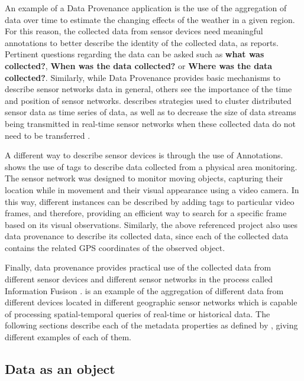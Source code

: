 An example of a Data Provenance application is the use of the aggregation of data
over time to estimate the changing effects of the weather in a given region.
For this reason, the collected data from sensor devices need meaningful
annotations to better describe the identity of the collected data, as 
\cite{sn-provenance} reports. Pertinent questions regarding the
data can be asked such as \textbf{what was collected?}, \textbf{When was the
data collected?} or \textbf{Where was the data collected?}. Similarly, while
Data Provenance provides basic mechanisms to describe sensor networks data in
general, others see the importance of the time and position of sensor networks.
\cite{sn-time-series} describes strategies used to cluster distributed sensor
data as time series of data, as well as to decrease the size of data streams
being transmitted in real-time sensor networks when these collected data do
not need to be transferred \cite{sn-data-reduction}.

A different way to describe sensor devices is through the use of
Annotations. \cite{sn-annotation} shows the use of tags to describe data
collected from a physical area monitoring. The sensor network was
designed to monitor moving objects, capturing their location while in
movement and their visual appearance using a video camera. In this way,
different instances can be described by adding tags to particular video frames, and
therefore, providing an efficient way to search for a specific frame based on
its visual observations. Similarly, the above referenced project also uses data
provenance to describe its collected data, since each of the collected data 
contains the related GPS coordinates of the observed object.

Finally, data provenance provides practical use of the collected data from
different sensor devices and different sensor networks in the process called
Information Fusison \cite{sn-info-fusion}. \cite{sn-geo-metadata} is an example of
the aggregation of different data from different devices located in different 
geographic sensor networks which is capable of processing spatial-temporal 
queries of real-time or historical data. The following sections describe each 
of the metadata properties as defined by \cite{sn-provenance}, giving different
examples of each of them.

\subsection{Data as an object}

